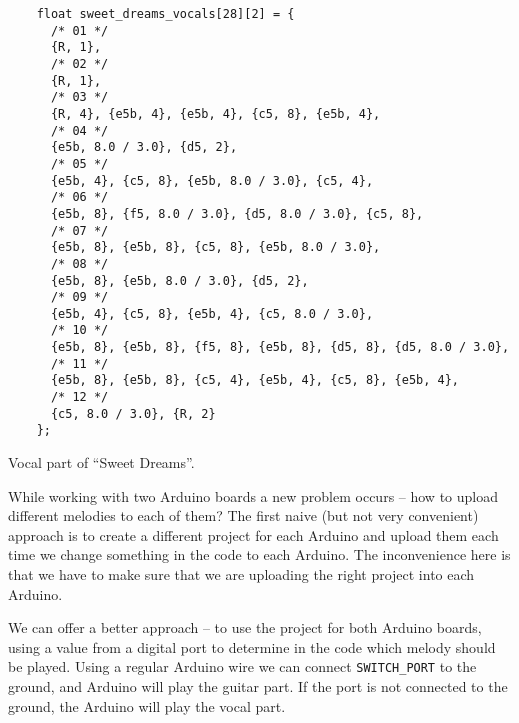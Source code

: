 \documentclass[../sparc.tex]{subfiles}
\begin{document}
\begin{listing}[!h]
  \begin{verbatim}
    float sweet_dreams_vocals[28][2] = {
      /* 01 */
      {R, 1},
      /* 02 */
      {R, 1},
      /* 03 */
      {R, 4}, {e5b, 4}, {e5b, 4}, {c5, 8}, {e5b, 4},
      /* 04 */
      {e5b, 8.0 / 3.0}, {d5, 2},
      /* 05 */
      {e5b, 4}, {c5, 8}, {e5b, 8.0 / 3.0}, {c5, 4},
      /* 06 */
      {e5b, 8}, {f5, 8.0 / 3.0}, {d5, 8.0 / 3.0}, {c5, 8},
      /* 07 */
      {e5b, 8}, {e5b, 8}, {c5, 8}, {e5b, 8.0 / 3.0},
      /* 08 */
      {e5b, 8}, {e5b, 8.0 / 3.0}, {d5, 2},
      /* 09 */
      {e5b, 4}, {c5, 8}, {e5b, 4}, {c5, 8.0 / 3.0},
      /* 10 */
      {e5b, 8}, {e5b, 8}, {f5, 8}, {e5b, 8}, {d5, 8}, {d5, 8.0 / 3.0},
      /* 11 */
      {e5b, 8}, {e5b, 8}, {c5, 4}, {e5b, 4}, {c5, 8}, {e5b, 4},
      /* 12 */
      {c5, 8.0 / 3.0}, {R, 2}
    };
  \end{verbatim}
  \caption{Vocal part of ``Sweet Dreams''.}
  \label{listing:music-band-sweet-dreams-2}
\end{listing}

While working with two Arduino boards a new problem occurs -- how to upload
different melodies to each of them?  The first naive (but not very convenient)
approach is to create a different project for each Arduino and upload them each
time we change something in the code to each Arduino.  The inconvenience here is
that we have to make sure that we are uploading the right project into each
Arduino.

We can offer a better approach -- to use the project for both Arduino boards,
using a value from a digital port to determine in the code which melody should
be played.  Using a regular Arduino wire we can connect \texttt{SWITCH\_PORT} to
the ground, and Arduino will play the guitar part.  If the port is not connected
to the ground, the Arduino will play the vocal part.
\end{document}
